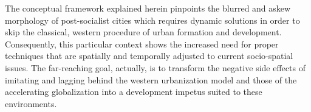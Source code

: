 The conceptual framework explained herein pinpoints the blurred and askew morphology of post-socialist cities which requires dynamic solutions in order to skip the classical, western procedure of urban formation and development. Consequently, this particular context shows the increased need for proper techniques that are spatially and temporally adjusted to current socio-spatial issues. The far-reaching goal, actually, is to transform the negative side effects of imitating and lagging behind the western urbanization model and those of the accelerating globalization into a development impetus suited to these environments.